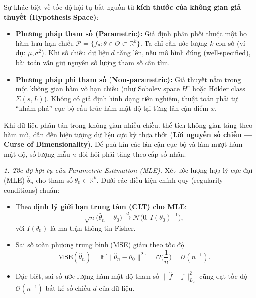 Sự khác biệt về tốc độ hội tụ bắt nguồn từ \textbf{kích thước của không gian giả thuyết (Hypothesis Space)}:
\begin{itemize}
\item \textbf{Phương pháp tham số (Parametric):} Giả định phân phối thuộc một họ hàm hữu hạn chiều $\mathcal{P}=\{f_\theta:\theta\in\Theta\subset\mathbb{R}^{k}\}$. Ta chỉ cần ước lượng $k$ con số (ví dụ: $\mu,\sigma^2$). Khi số chiều dữ liệu $d$ tăng lên, nếu mô hình đúng (well-specified), bài toán vẫn giữ nguyên số lượng tham số cần tìm.
\item \textbf{Phương pháp phi tham số (Non-parametric):} Giả thuyết nằm trong một không gian hàm vô hạn chiều (như Sobolev space $H^{s}$ hoặc Hölder class $\Sigma(s,L)$). Không có giả định hình dạng tiên nghiệm, thuật toán phải tự ``khám phá'' cục bộ cấu trúc hàm mật độ tại từng lân cận điểm $x$.
\end{itemize}
Khi dữ liệu phân tán trong không gian nhiều chiều, thể tích không gian tăng theo hàm mũ, dẫn đến hiện tượng dữ liệu cực kỳ thưa thớt (\textbf{Lời nguyền số chiều --- Curse of Dimensionality}). Để phủ kín các lân cận cục bộ và làm mượt hàm mật độ, số lượng mẫu $n$ đòi hỏi phải tăng theo cấp số nhân.


\textit{1. Tốc độ hội tụ của Parametric Estimation (MLE).} Xét ước lượng hợp lý cực đại (MLE) $\widehat\theta_n$ cho tham số $\theta_0\in\mathbb{R}^{k}$. Dưới các điều kiện chính quy (regularity conditions) chuẩn:
\begin{itemize}
\item Theo \textbf{định lý giới hạn trung tâm (CLT) cho MLE}:
\[ \sqrt{n}\big(\widehat\theta_n-\theta_0\big)\xrightarrow{d}\mathcal{N}\big(0,\,I(\theta_0)^{-1}\big), \]
với $I(\theta_0)$ là ma trận thông tin Fisher.
\item Sai số toàn phương trung bình (MSE) giảm theo tốc độ
\[ \mathrm{MSE}(\widehat\theta_n)=\mathbb{E}\big[\|\widehat\theta_n-\theta_0\|^{2}\big]=\mathcal{O}\Big(\frac1n\Big)=\mathcal{O}(n^{-1}). \]
\item Đặc biệt, sai số ước lượng hàm mật độ tham số $\|\widehat f-f\|_{L_2}^{2}$ cũng đạt tốc độ $\mathcal{O}(n^{-1})$ bất kể số chiều $d$ của dữ liệu.
\end{itemize}

